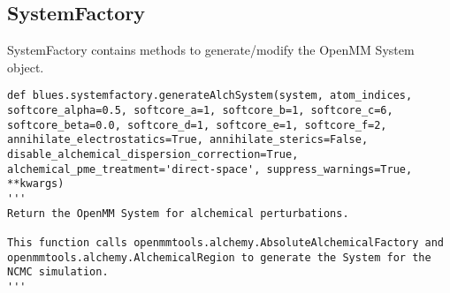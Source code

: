 \hypertarget{systemfactory}{%
\subsection{SystemFactory}\label{systemfactory}}
SystemFactory contains methods to generate/modify the OpenMM System object.

\begin{description}
\begin{verbatim}
def blues.systemfactory.generateAlchSystem(system, atom_indices, softcore_alpha=0.5, softcore_a=1, softcore_b=1, softcore_c=6, softcore_beta=0.0, softcore_d=1, softcore_e=1, softcore_f=2, annihilate_electrostatics=True, annihilate_sterics=False, disable_alchemical_dispersion_correction=True, alchemical_pme_treatment='direct-space', suppress_warnings=True, **kwargs)
'''
Return the OpenMM System for alchemical perturbations.

This function calls openmmtools.alchemy.AbsoluteAlchemicalFactory and
openmmtools.alchemy.AlchemicalRegion to generate the System for the
NCMC simulation.
'''
\end{verbatim}



\end{description}
